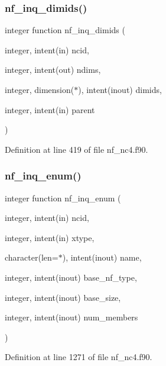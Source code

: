 \subsubsection{\texorpdfstring{nf\+\_\+inq\+\_\+dimids()}{nf\_inq\_dimids()}}
{\footnotesize\ttfamily integer function nf\+\_\+inq\+\_\+dimids (\begin{DoxyParamCaption}\item[{integer, intent(in)}]{ncid,  }\item[{integer, intent(out)}]{ndims,  }\item[{integer, dimension($\ast$), intent(inout)}]{dimids,  }\item[{integer, intent(in)}]{parent }\end{DoxyParamCaption})}



Definition at line 419 of file nf\+\_\+nc4.\+f90.

\mbox{\label{nf__nc4_8f90_aa8e61e8be696b03461c961b19d3505ec}} 
\subsubsection{\texorpdfstring{nf\+\_\+inq\+\_\+enum()}{nf\_inq\_enum()}}
{\footnotesize\ttfamily integer function nf\+\_\+inq\+\_\+enum (\begin{DoxyParamCaption}\item[{integer, intent(in)}]{ncid,  }\item[{integer, intent(in)}]{xtype,  }\item[{character(len=$\ast$), intent(inout)}]{name,  }\item[{integer, intent(inout)}]{base\+\_\+nf\+\_\+type,  }\item[{integer, intent(inout)}]{base\+\_\+size,  }\item[{integer, intent(inout)}]{num\+\_\+members }\end{DoxyParamCaption})}



Definition at line 1271 of file nf\+\_\+nc4.\+f90.

\mbox{\label{nf__nc4_8f90_a2b63323d770247e1e5bd83f210ffe591}} 
